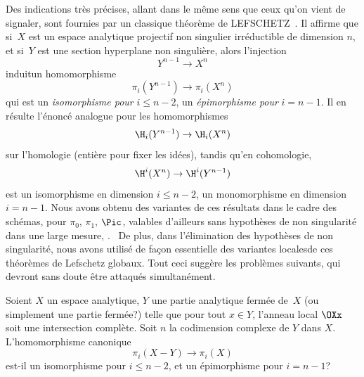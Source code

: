 Des indications tr\`es pr\'ecises, allant dans le m\^eme sens que ceux qu'on vient de signaler, sont fournies par un classique th\'eor\`eme de LEFSCHETZ~\cite{XIII.7}. Il affirme que si~$X$ est un espace analytique projectif non singulier irr\'eductible de dimension $n$, et si~$Y$ est une section hyperplane non singuli\`ere, alors l'injection
$$Y^{n-1}\to X^n$$
induit\pageoriginale un homomorphisme
$$
\pi_i(Y^{n-1})\to \pi_i(X^n)$$
qui est un \emph{isomorphisme pour} $i\le n-2$, un \emph{\'epimorphisme pour} $i=n-1$. Il en r\'esulte l'\'enonc\'e analogue pour les homomorphismes
$$
\H_i(Y^{n-1})\to \H_i(X^n)$$
sur l'homologie (enti\`ere pour fixer les id\'ees), tandis qu'en cohomologie,
$$
\H^i(X^n)\to\H^i(Y^{n-1})
$$
est un isomorphisme en dimension $i\le n-2$, un monomorphisme en dimension $i=n-1$. Nous avons obtenu des variantes de ces r\'esultats dans le cadre des sch\'emas, pour $\pi_0$, $\pi_1$, $\Pic$, valables d'ailleurs sans hypoth\`eses de non singularit\'e dans une large mesure, \cf \Exp {}. \ De plus, dans l'\'elimination des hypoth\`eses de non singularit\'e, nous avons utilis\'e de fa\c con essentielle des variantes \og locales\fg de ces th\'eor\`emes de Lefschetz globaux. Tout ceci sugg\`ere les probl\`emes suivants, qui devront sans doute \^etre attaqu\'es simultan\'ement.

\begin{probleme} \label{XIII.4.1}
Soient $X$ un espace analytique, $Y$ une partie analytique ferm\'ee de~$X$ (ou simplement une partie ferm\'ee?) telle que pour tout $x\in Y$, l'anneau local $\OXx$ soit une intersection compl\`ete. Soit $n$ la codimension complexe de $Y$ dans $X$. L'homomorphisme canonique
$$
\pi_i(X-Y)\to \pi_i(X)$$
est-il un isomorphisme pour $i\le n-2$, et un \'epimorphisme pour $i=n-1$?
\end{probleme}

